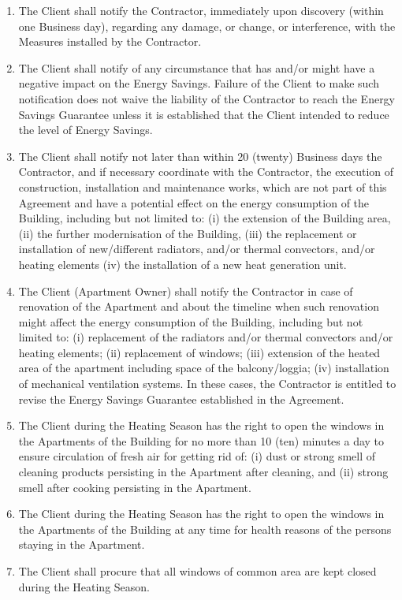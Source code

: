 \begin{multicols}{2}
\begin{enumerate}
	\item The Client shall notify the Contractor, immediately upon discovery (within one Business day), regarding any damage, or change, or interference, with the Measures installed by the Contractor. 
	\item The Client shall notify of any circumstance that has and/or might have a negative impact on the Energy Savings. Failure of the Client to make such notification does not waive the liability of the Contractor to reach the Energy Savings Guarantee unless it is established that the Client intended to reduce the level of Energy Savings. 
	\item The Client shall notify not later than within 20 (twenty) Business days the Contractor, and if necessary coordinate with the Contractor, the execution of construction, installation and maintenance works, which are not part of this Agreement and have a potential effect on the energy consumption of the Building, including but not limited to: (i) the extension of the Building area, (ii) the further modernisation of the Building, (iii) the replacement or installation of new/different radiators, and/or thermal convectors, and/or heating elements (iv) the installation of a new heat generation unit. 
	\item The Client (Apartment Owner) shall notify the Contractor in case of renovation of the Apartment and about the timeline when such renovation might affect the energy consumption of the Building, including but not limited to: (i) replacement of the radiators and/or thermal convectors and/or heating elements; (ii) replacement of windows; (iii) extension of the heated area of the apartment including space of the balcony/loggia; (iv) installation of mechanical ventilation systems. In these cases, the Contractor is entitled to revise the Energy Savings Guarantee established in the Agreement. 
	\item The Client during the Heating Season has the right to open the windows in the Apartments of the Building for no more than 10 (ten) minutes a day to ensure circulation of fresh air for getting rid of: (i) dust or strong smell of cleaning products persisting in the Apartment after cleaning, and (ii) strong smell after cooking persisting in the Apartment. 
	\item The Client during the Heating Season has the right to open the windows in the Apartments of the Building at any time for health reasons of the persons staying in the Apartment. 
	\item The Client shall procure that all windows of common area are kept closed during the Heating Season. 

\end{enumerate}
\end{multicols}
